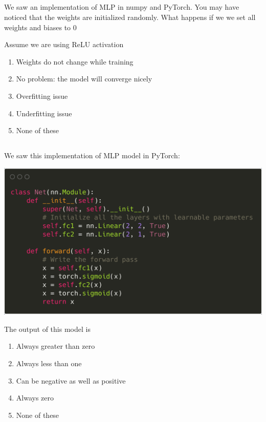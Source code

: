 \begin{frame}
\section{}
We saw an implementation of MLP in numpy and PyTorch. You may have noticed that the weights are initialized randomly. What happens if we we set all weights and biases to 0

Assume we are using ReLU activation

\begin{enumerate}[label=(\Alph*)]
\item Weights do not change while training    %
\item No problem: the model will converge nicely
\item Overfitting issue
\item Underfitting issue
\item None of these  %
\end{enumerate}
\end{frame}

\begin{frame}
\section{}
We saw this implementation of MLP model in PyTorch:

\includegraphics[scale=0.1]{images/q32_2.png}

The output of this model is
\begin{enumerate}[label=(\Alph*)]
\item Always greater than zero    %
\item Always less than one   %
\item Can be negative as well as positive
\item Always zero
\item None of these   %
\end{enumerate}
\end{frame}

